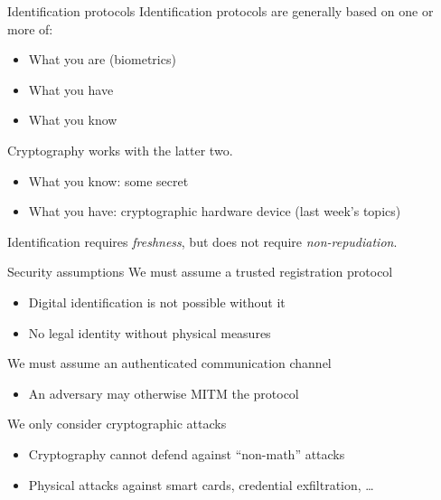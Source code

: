 \begin{frame}{Identification protocols}
  \pause
  Identification protocols are generally based on one or more of:
  \begin{itemize}[<+(1)->]
    \item What you are (biometrics)
    \item What you have
    \item What you know
  \end{itemize}

  \vspace*{1em}

  \pause
  Cryptography works with the latter two.
  \begin{itemize}[<+(1)->]
    \item What you know: some secret
    \item What you have: cryptographic hardware device (last week's topics)
  \end{itemize}

  \vspace*{1em}

  \pause
  Identification requires \emph{freshness}, but does not require \emph{non-repudiation}.
\end{frame}

\begin{frame}{Security assumptions}
  \pause
  We must assume a trusted registration protocol
  \begin{itemize}[<+(1)->]
    \item Digital identification is not possible without it
    \item No legal identity without physical measures
  \end{itemize}

  \vspace*{1em}

  \pause
  We must assume an authenticated communication channel
  \begin{itemize}[<+(1)->]
    \item An adversary may otherwise MITM the protocol
  \end{itemize}

  \vspace*{1em}

  \pause
  We only consider cryptographic attacks
  \begin{itemize}[<+(1)->]
    \item Cryptography cannot defend against \enquote{non-math} attacks
    \item Physical attacks against smart cards, credential exfiltration, \dots
  \end{itemize}
\end{frame}

